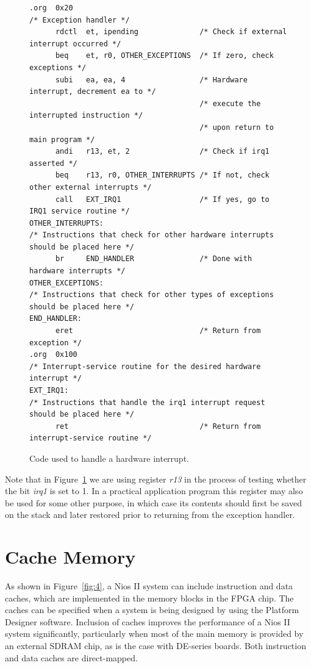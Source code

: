 \documentclass[11pt, twoside, pdftex]{article}
\begin{document}
\begin{figure}[H]
\begin{lstlisting}[style=defaultNiosStyle] %%%\begin{singlespace}
.org  0x20
/* Exception handler */
      rdctl  et, ipending              /* Check if external interrupt occurred */
      beq    et, r0, OTHER_EXCEPTIONS  /* If zero, check exceptions */
      subi   ea, ea, 4                 /* Hardware interrupt, decrement ea to */  
                                       /* execute the interrupted instruction */
                                       /* upon return to main program */ 
      andi   r13, et, 2                /* Check if irq1 asserted */
      beq    r13, r0, OTHER_INTERRUPTS /* If not, check other external interrupts */
      call   EXT_IRQ1                  /* If yes, go to IRQ1 service routine */
OTHER_INTERRUPTS:
/* Instructions that check for other hardware interrupts should be placed here */
      br     END_HANDLER               /* Done with hardware interrupts */
OTHER_EXCEPTIONS:
/* Instructions that check for other types of exceptions should be placed here */
END_HANDLER:
      eret                             /* Return from exception */
.org  0x100
/* Interrupt-service routine for the desired hardware interrupt */
EXT_IRQ1:
/* Instructions that handle the irq1 interrupt request should be placed here */
      ret                              /* Return from interrupt-service routine */
\end{lstlisting}
	\caption{Code used to handle a hardware interrupt.}
	\label{fig:7}
\end{figure}

Note that in Figure~\ref{fig:7} we are using register {\it r13} in the process of testing 
whether the bit {\it irq1} is set to 1. In a practical application program this
register may also be used for some other purpose, in which case its contents
should first be saved on the stack and later restored prior to returning
from the exception handler.

\noindent


\section{Cache Memory}

As shown in Figure~\ref{fig:4}, a Nios II system can include instruction and data caches,
which are implemented in the memory blocks in the FPGA chip.
The caches can be specified when a system is being designed by using the Platform Designer
software. Inclusion of caches improves the performance of a Nios II system significantly,
particularly when most of the main memory is provided by an external SDRAM chip, as is 
the case with DE-series boards. Both instruction and data caches are direct-mapped.
 
\end{document}
